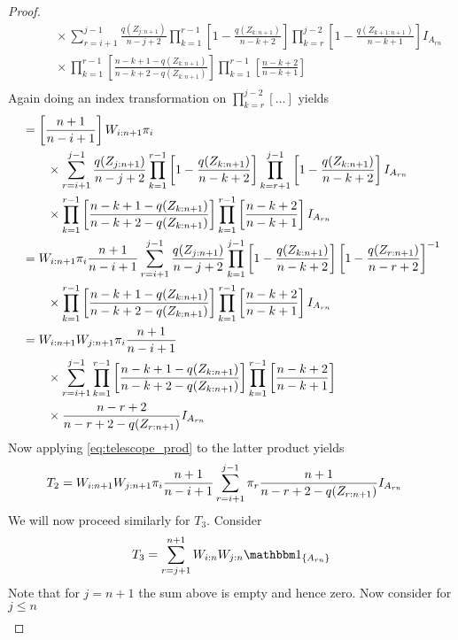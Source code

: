 \begin{proof}
\begin{align*}
& \qquad \times \sum\limits_{r=i+1}^{j-1} \frac{q(Z_{j:n+1})}{n-j+2} \prod_{k=1}^{r-1}\left[1-\frac{q(Z_{k:n+1})}{n-k+2}\right]\prod_{k=r}^{j-2}\left[1-\frac{q(Z_{k+1:n+1})}{n-k+1}\right]I_{A_{rn}}\\
& \qquad \times \prod_{k=1}^{r-1}\left[\frac{n-k+1-q(Z_{k:n+1})}{n-k+2-q(Z_{k:n+1})}\right] \prod_{k=1}^{r-1}\left[\frac{n-k+2}{n-k+1}\right]\\
\end{align*}
%
Again doing an index transformation on $\prod_{k=r}^{j-2}[\ldots]$ yields
\begin{align*}
	&= \left[\frac{n+1}{n-i+1}\right]W_{i:n+1}\pi_i\\
	& \qquad \times \sum\limits_{r=i+1}^{j-1} \frac{q(Z_{j:n+1})}{n-j+2} \prod_{k=1}^{r-1}\left[1-\frac{q(Z_{k:n+1})}{n-k+2}\right]\prod_{k=r+1}^{j-1}\left[1-\frac{q(Z_{k:n+1})}{n-k+2}\right]I_{A_{rn}}\\
	& \qquad \times \prod_{k=1}^{r-1}\left[\frac{n-k+1-q(Z_{k:n+1})}{n-k+2-q(Z_{k:n+1})}\right] \prod_{k=1}^{r-1}\left[\frac{n-k+2}{n-k+1}\right]I_{A_{rn}}\\	
	&= W_{i:n+1} \pi_i \frac{n+1}{n-i+1} \sum\limits_{r=i+1}^{j-1}\frac{q(Z_{j:n+1})}{n-j+2} \prod_{k=1}^{j-1}\left[1-\frac{q(Z_{k:n+1})}{n-k+2}\right] \left[ 1 - \frac{q(Z_{r:n+1})}{n-r+2}\right]^{-1}\\
	& \qquad \times \prod_{k=1}^{r-1} \left[\frac{n-k+1-q(Z_{k:n+1})}{n-k+2-q(Z_{k:n+1})}\right] \prod_{k=1}^{r-1}\left[\frac{n-k+2}{n-k+1}\right]I_{A_{rn}}\\
	&= W_{i:n+1}W_{j:n+1} \pi_i \frac{n+1}{n-i+1} \\
	& \qquad \times \sum\limits_{r=i+1}^{j-1} \prod_{k=1}^{r-1} \left[\frac{n-k+1-q(Z_{k:n+1})}{n-k+2-q(Z_{k:n+1})}\right] \prod_{k=1}^{r-1}\left[\frac{n-k+2}{n-k+1}\right]\\
	& \qquad \times \frac{n-r+2}{n-r+2-q(Z_{r:n+1})} I_{A_{rn}}\\
\end{align*}
%
Now applying \eqref{eq:telescope_prod} to the latter product yields
\begin{align*}
	T_2	&= W_{i:n+1}W_{j:n+1} \pi_i \frac{n+1}{n-i+1} \sum\limits_{r=i+1}^{j-1} \pi_r \frac{n+1}{n-r+2-q(Z_{r:n+1})} I_{A_{rn}}	
\end{align*}
%
We will now proceed similarly for $T_3$. Consider
$$T_3 = \sum\limits_{r=j+1}^{n+1} \wn{i}{n}\wn{j}{n}\I{A_{rn}}$$
Note that for $j=n+1$ the sum above is empty and hence zero. Now consider for $j\leq n$
\begin{align*}

\end{align*}
\end{proof}
